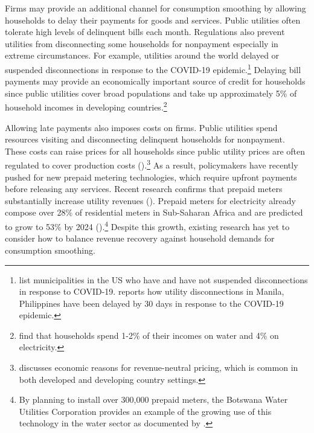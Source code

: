 \documentclass[12pt]{article}
\begin{document}
Firms may provide an additional channel for consumption smoothing by allowing households to delay their payments for goods and services.  Public utilities often tolerate high levels of delinquent bills each month.  Regulations also prevent utilities from disconnecting some households for nonpayment especially in extreme circumstances.  For example, utilities around the world delayed or suspended disconnections in response to the COVID-19 epidemic.\footnote{\cite{bufordcampbell2020} list municipalities in the US who have and have not suspended disconnections in response to COVID-19.  \cite{domingo2020} reports how utility disconnections in Manila, Philippines have been delayed by 30 days in response to the COVID-19 epidemic.}   Delaying bill payments may provide an economically important source of credit for households since public utilities cover broad populations and take up approximately 5\% of household incomes in developing countries.\footnote{\cite{komives2006distributional} find that households spend 1-2\% of their incomes on water and 4\% on electricity.}
 
Allowing late payments also imposes costs on firms.  Public utilities spend resources visiting and disconnecting delinquent households for nonpayment.  These costs can raise prices for all households since public utility prices are often regulated to cover production costs (\cite{hoque2013state}).\footnote{\cite{laffont2005regulation} discusses economic reasons for revenue-neutral pricing, which is common in both developed and developing country settings.}  As a result, policymakers have recently pushed for new prepaid metering technologies, which require upfront payments before releasing any services.  Recent research confirms that prepaid meters substantially increase utility revenues (\cite{jack2020charging}).  Prepaid meters for electricity already compose over 28\% of residential meters in Sub-Saharan Africa and are predicted to grow to 53\% by 2024 (\cite{northeast2014}).\footnote{By planning to install over 300,000 prepaid meters, the Botswana Water Utilities Corporation provides an example of the growing use of this technology in the water sector as documented by \cite{heymans2014limits}.}  Despite this growth, existing research has yet to consider how to balance revenue recovery against household demands for consumption smoothing.
\end{document}

